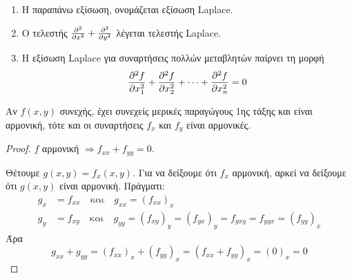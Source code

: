 \begin{rem}
\item {}
    \begin{enumerate}
        \item Η παραπάνω εξίσωση, ονομάζεται εξίσωση Laplace.
        \item Ο τελεστής $ \pdv[2]{}{x} + \pdv[2]{}{y} $ λέγεται τελεστής 
            Laplace.
        \item Η εξίσωση Laplace για συναρτήσεις πολλών μεταβλητών παίρνει τη 
            μορφή
            \[
                \pdv[2]{f}{x_{1}} + \pdv[2]{f}{x_{2}} + \cdots + 
                \pdv[2]{f}{x_{n}}=0 
            \] 
    \end{enumerate}
\end{rem}

\begin{prop}
\item {}
    Αν $ f(x,y) $ συνεχής, έχει συνεχείς μερικές παραγώγους 1ης τάξης 
    και είναι αρμονική, τότε και οι συναρτήσεις $ f_{x} $ και $ f_{y} $
    είναι αρμονικές. 
\end{prop}
\begin{proof}
\item {}
    $f$ αρμονική $ \Rightarrow f_{xx}+f_{yy}=0 $.

    Θέτουμε $ g(x,y)=f_{x}(x,y) $. Για να δείξουμε ότι $ f_{x} $ αρμονική, 
    αρκεί να δείξουμε ότι $ g(x,y) $ είναι αρμονική. Πράγματι:
    \begin{align*}
        g_{x} &= f_{xx} \quad \text{και} \quad g_{xx} = (f_{xx})_{x} \\ 
        g_{y} &= f_{xy} \quad \text{και} \quad g_{yy} = (f_{xy})_{y} =
        (f_{yx})_{y} = f_{yxy} = f_{yyx} = (f_{yy})_{x}
    \end{align*}
    Άρα 
    \[
        g_{xx}+g_{yy} = (f_{xx})_{x} + (f_{yy})_{x} = 
        (f_{xx}+f_{yy})_{x}= (0)_{x} =0
    \] 
\end{proof}

